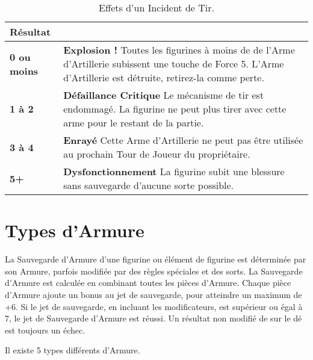 \begin{table}[!htbp]
\centering
\begin{tabular}{M{2cm}m{12cm}}
\textbf{Résultat} & \centering{} \tabularnewline
\hline
\textbf{0 ou moins} & \textbf{Explosion !}\vspace*{3pt}\newline 
Toutes les figurines à moins de  de l'Arme d'Artillerie subissent une touche de Force 5. L'Arme d'Artillerie est détruite, retirez-la comme perte. \tabularnewline
\textbf{1 à 2} & \textbf{Défaillance Critique}\vspace*{3pt}\newline 
Le mécanisme de tir est endommagé. La figurine ne peut plus tirer avec cette arme pour le restant de la partie. \tabularnewline
\textbf{3 à 4} & \textbf{Enrayé}\vspace*{3pt}\newline
Cette Arme d'Artillerie ne peut pas être utilisée au prochain Tour de Joueur du propriétaire. \tabularnewline
\textbf{5+} & \textbf{Dysfonctionnement}\vspace*{3pt}\newline
La figurine subit une blessure sans sauvegarde d'aucune sorte possible. \tabularnewline
\hline
\end{tabular}
\caption{Effets d'un Incident de Tir.}
\label{table/misfire_table}
\end{table}

\newpage
\hypertarget{armourtypes}{\section{Types d'Armure}}
\label{armour_types}

La Sauvegarde d'Armure d'une figurine ou élément de figurine est déterminée par son Armure, parfois modifiée par des règles spéciales et des sorts. La Sauvegarde d'Armure est calculée en combinant toutes les pièces d'Armure. Chaque pièce d'Armure ajoute un bonus au jet de sauvegarde, pour atteindre un maximum de +6. Si le jet de sauvegarde, en incluant les modificateurs, est supérieur ou égal à 7, le jet de Sauvegarde d'Armure est réussi. Un résultat non modifié de  sur le dé est toujours un échec.

Il existe 5 types différents d'Armure.

